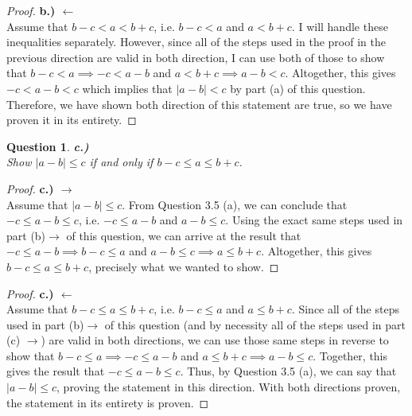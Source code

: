 \documentclass[10pt,a4paper]{article}
\newtheorem*{question*}{Question}
\theoremstyle{definition}
\begin{document}
\begin{proof}{\textbf{b.) $\leftarrow$}}
\\Assume that $b - c < a < b + c$, i.e. $b-c < a$ and $a < b + c$. I will handle these inequalities separately. However, since all of the steps used in the proof in the previous direction are valid in both direction, I can use both of those to show that $b-c < a \implies -c < a- b$ and $a < b + c \implies a -b < c$. Altogether, this gives $-c < a- b < c$ which implies that $|a - b| < c$ by part (a) of this question.
\\Therefore, we have shown both direction of this statement are true, so we have proven it in its entirety. 
\end{proof}

\begin{question*}{\textbf{c.)}}
\\Show $|a-b| \leq c$ if and only if $b-c \leq a \leq b +c$.
\end{question*}

\begin{proof}{\textbf{c.) $\rightarrow$}}
\\Assume that $|a - b| \leq c$. From Question 3.5 (a), we can conclude that $-c \leq a - b \leq c$, i.e. $-c \leq a - b$ and $a- b \leq c$. Using the exact same steps used in part (b)$\rightarrow$ of this question, we can arrive at the result that $-c \leq a-b \implies b-c \leq a$ and $a -b \leq c \implies a \leq b + c$. Altogether, this gives $b - c \leq a \leq b +c$, precisely what we wanted to show.
\end{proof}

\begin{proof}{\textbf{c.) $\leftarrow$}}
\\Assume that $b - c \leq a \leq b +c$, i.e. $b - c \leq a$ and $a \leq b + c$. Since all of the steps used in part (b)$\rightarrow$ of this question (and by necessity all of the steps used in part (c) $\rightarrow$) are valid in both directions, we can use those same steps in reverse to show that $b - c \leq a \implies -c \leq a - b$ and $a \leq b + c \implies a - b \leq c$. Together, this gives the result that $ -c \leq a -b \leq c$. Thus, by Question 3.5 (a), we can say that $|a -b| \leq c$, proving the statement in this direction. With both directions proven, the statement in its entirety is proven. 
\end{proof}
\end{document}
